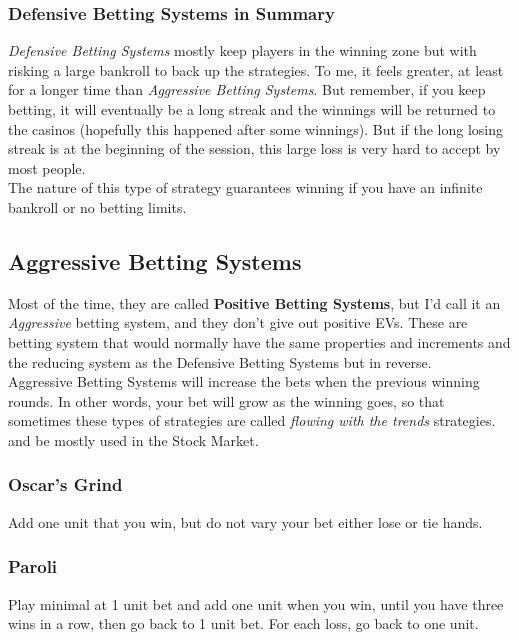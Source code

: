 \documentclass{article}
\begin{document}
\subsubsection{Defensive Betting Systems in Summary}
\emph{Defensive Betting Systems} mostly keep players in the winning zone but with risking a large bankroll to back up the strategies.  To me, it feels greater, at least for a longer time than \emph{Aggressive Betting Systems}.  But remember, if you keep betting, it will eventually be a long streak and the winnings will be returned to the casinos (hopefully this happened after some winnings).  But if the long losing streak is at the beginning of the session, this large loss is very hard to accept by most people.\\  

The nature of this type of strategy guarantees winning if you have an infinite bankroll or no betting limits.

\subsection{Aggressive Betting Systems}

Most of the time, they are called \textbf{Positive Betting Systems}, but I'd call it an \emph{Aggressive} betting system, and they don't give out positive EVs.  These are betting system that would normally have the same properties and increments and the reducing system as the Defensive Betting Systems but in reverse.  \\

Aggressive Betting Systems will increase the bets when the previous winning rounds.  In other words, your bet will grow as the winning goes, so that sometimes these types of strategies are called \emph{flowing with the trends} strategies.  and be mostly used in the Stock Market.\\

\subsubsection{Oscar's Grind}
Add one unit that you win, but do not vary your bet either lose or tie hands.\\

\subsubsection{Paroli}
Play minimal at 1 unit bet and add one unit when you win, until you have three wins in a row, then go back to 1 unit bet.  For each loss, go back to one unit.\\
\end{document}
